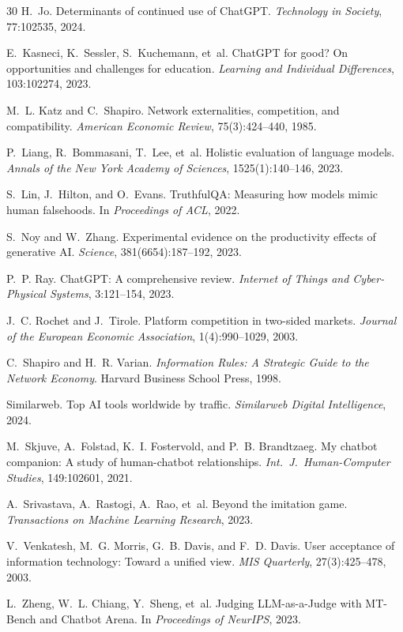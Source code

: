 \documentclass[10pt,twocolumn]{article}
\begin{document}
\begin{thebibliography}{30}
 H.~Jo. Determinants of continued use of {ChatGPT}. {\em Technology in Society}, 77:102535, 2024.

 E.~Kasneci, K.~Sessler, S.~Kuchemann, et~al. {ChatGPT} for good? On opportunities and challenges for education. {\em Learning and Individual Differences}, 103:102274, 2023.

 M.~L. Katz and C.~Shapiro. Network externalities, competition, and compatibility. {\em American Economic Review}, 75(3):424--440, 1985.

 P.~Liang, R.~Bommasani, T.~Lee, et~al. Holistic evaluation of language models. {\em Annals of the New York Academy of Sciences}, 1525(1):140--146, 2023.

 S.~Lin, J.~Hilton, and O.~Evans. {TruthfulQA}: Measuring how models mimic human falsehoods. In {\em Proceedings of ACL}, 2022.

 S.~Noy and W.~Zhang. Experimental evidence on the productivity effects of generative {AI}. {\em Science}, 381(6654):187--192, 2023.

 P.~P. Ray. {ChatGPT}: A comprehensive review. {\em Internet of Things and Cyber-Physical Systems}, 3:121--154, 2023.

 J.~C. Rochet and J.~Tirole. Platform competition in two-sided markets. {\em Journal of the European Economic Association}, 1(4):990--1029, 2003.

 C.~Shapiro and H.~R. Varian. {\em Information Rules: A Strategic Guide to the Network Economy}. Harvard Business School Press, 1998.

 Similarweb. Top {AI} tools worldwide by traffic. {\em Similarweb Digital Intelligence}, 2024.

 M.~Skjuve, A.~Folstad, K.~I. Fostervold, and P.~B. Brandtzaeg. My chatbot companion: A study of human-chatbot relationships. {\em Int.\ J.\ Human-Computer Studies}, 149:102601, 2021.

 A.~Srivastava, A.~Rastogi, A.~Rao, et~al. Beyond the imitation game. {\em Transactions on Machine Learning Research}, 2023.

 V.~Venkatesh, M.~G. Morris, G.~B. Davis, and F.~D. Davis. User acceptance of information technology: Toward a unified view. {\em MIS Quarterly}, 27(3):425--478, 2003.

 L.~Zheng, W.~L. Chiang, Y.~Sheng, et~al. Judging {LLM}-as-a-Judge with {MT-Bench} and {Chatbot Arena}. In {\em Proceedings of NeurIPS}, 2023.


\end{thebibliography}
\end{document}
